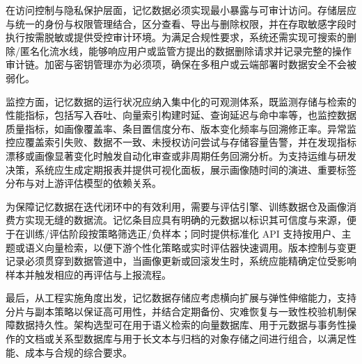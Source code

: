 在访问控制与隐私保护层面，记忆数据必须实现最小暴露与可审计访问。存储层应与统一的身份与权限管理结合，区分查看、导出与删除权限，并在存取敏感字段时执行按需脱敏或提供受控审计环境。为满足合规性要求，系统还需实现可搜索的删除/匿名化流水线，能够响应用户或监管方提出的数据删除请求并记录完整的操作审计链。加密与密钥管理亦为必须项，确保在多租户或云端部署时数据安全不会被弱化。

监控方面，记忆数据的运行状况应纳入集中化的可观测体系，既监测存储与检索的性能指标，包括写入吞吐、向量索引构建时延、查询延迟与命中率等，也监控数据质量指标，如画像覆盖率、条目置信度分布、版本变化频率与回溯修正率。异常监控应覆盖索引失败、数据不一致、未授权访问尝试与存储容量告警，并在发现指标漂移或画像显著变化时触发自动化审查或非周期任务回溯分析。为支持运维与研发决策，系统应生成定期报表并提供可视化面板，展示画像随时间的演进、重要标签分布与对上游评估模型的依赖关系。

为保障记忆数据在迭代闭环中的有效利用，需要与评估引擎、训练数据仓及画像消费方实现无缝的数据流。记忆条目应具有明确的元数据以标识其可信度与来源，便于在训练/评估阶段按策略筛选正/负样本；同时提供标准化 API 支持按用户、主题或语义向量检索，以便下游个性化策略或实时评估器快速调用。版本控制与变更记录必须贯穿到数据管道中，当画像更新或回滚发生时，系统应能精确定位受影响样本并触发相应的再评估与上报流程。

最后，从工程实施角度出发，记忆数据存储应考虑横向扩展与弹性伸缩能力，支持分片与副本策略以保证高可用性，并结合定期备份、灾难恢复与一致性校验机制保障数据持久性。架构选型可在用于语义检索的向量数据库、用于元数据与事务性操作的文档或关系型数据库与用于长文本与归档的对象存储之间进行组合，以满足性能、成本与合规的综合要求。
